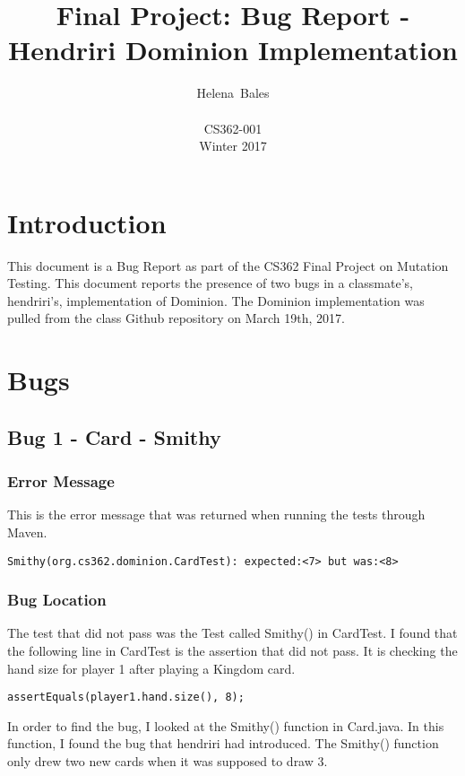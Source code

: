 \documentclass[letterpaper,10pt]{article}
\title{Final Project: Bug Report - Hendriri Dominion Implementation}
\author{Helena~Bales\\ \\ CS362-001 \\ Winter 2017}
\begin{document}
\maketitle

\clearpage
\tableofcontents
\clearpage

\section{Introduction}
This document is a Bug Report as part of the CS362 Final Project on Mutation Testing. This document 
reports the presence of two bugs in a classmate's, hendriri's, implementation of Dominion. The 
Dominion implementation was pulled from the class Github repository on March 19th, 2017.

\section{Bugs}
\subsection{Bug 1 - Card - Smithy}
\subsubsection{Error Message}
This is the error message that was returned when running the tests through Maven.

\begin{lstlisting}
Smithy(org.cs362.dominion.CardTest): expected:<7> but was:<8>
\end{lstlisting}

\subsubsection{Bug Location}
The test that did not pass was the Test called Smithy() in CardTest. I found that the following line 
in CardTest is the assertion that did not pass. It is checking the hand size for player 1 after 
playing a Kingdom card.

\begin{lstlisting}
assertEquals(player1.hand.size(), 8);
\end{lstlisting}

In order to find the bug, I looked at the Smithy() function in Card.java. In this function, I found 
the bug that hendriri had introduced. The Smithy() function only drew two new cards when it was 
supposed to draw 3. 
\end{document}
